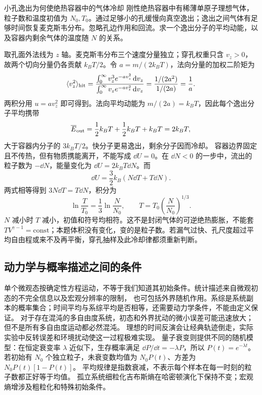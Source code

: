 \Needspace{180pt}
\begin{origexamplebox}{小孔逸出为何使绝热容器中的气体冷却}\label{ch18:ex:teaching-effusion}
刚性绝热容器中有稀薄单原子理想气体，粒子数和温度初值为 $N_0,T_0$。通过足够小的孔缓慢向真空逸出；逸出之间气体有足够时间恢复麦克斯韦分布。忽略孔边作用和回流。求一个逸出分子的平均动能，以及容器内剩余气体的温度随 $N$ 的关系。

\StatQEffusion
\end{origexamplebox}
\Needspace{65pt}
\begin{xesolution}
取孔面外法线为 $z$ 轴。麦克斯韦分布三个速度分量独立；穿孔权重只含 $v_z>0$，故两个切向分量仍各贡献 $k_BT/2$。令 $a=m/(2k_BT)$，法向分量的加权二阶矩为
\[
 \langle v_z^2\rangle_{\rm hit}
 =\frac{\int_0^\infty v_z^3e^{-av_z^2}\mathop{}\!\mathrm d v_z}
        {\int_0^\infty v_ze^{-av_z^2}\mathop{}\!\mathrm d v_z}
 =\frac{1/(2a^2)}{1/(2a)}=\frac1a.
\]
两积分用 $u=av_z^2$ 即可得到。法向平均动能为 $m/(2a)=k_BT$，因此每个逸出分子平均携带
\[
 \overline E_{\rm out}=\frac12k_BT+\frac12k_BT+k_BT=2k_BT,
\]
大于容器内分子的 $3k_BT/2$。快分子更易逸出，剩余分子因而冷却。
容器边界固定且不传热，但有物质携能离开，不能写成 $\dd U=0$。在 $\dd N<0$ 的一步中，流出的粒子数为 $-\dd N$，能量变化为 $\dd U=2k_BT\dd N$。而
\[
 \dd U=\frac32k_B(N\dd T+T\dd N).
\]
两式相等得到 $3N\dd T=T\dd N$，积分为
\[
 \ln\frac{T}{T_0}=\frac13\ln\frac{N}{N_0},\qquad
 T=T_0\left(\frac{N}{N_0}\right)^{1/3}.
\]
$N$ 减小时 $T$ 减小，初值和符号均相符。这不是封闭气体的可逆绝热膨胀，不能套 $TV^{\gamma-1}=\mathrm{const}$；本题体积没有变化，变的是粒子数。若漏气过快、孔尺度超过平均自由程或来不及再平衡，穿孔抽样及此冷却律都须重新判断。

\StatAEffusion
\end{xesolution}

\subsection{动力学与概率描述之间的条件}

单个微观态按确定性方程运动，不等于我们知道其初始条件。统计描述来自微观初态的不完全信息以及宏观分辨率的限制，
也可包括外界随机作用。系综是系统副本的概率集合；时间平均与系综平均是否相等，还需要动力学条件，不能由定义保证。
对于存在混沌的多自由度系统，初态和外界扰动的微小误差可能迅速放大；但不是所有多自由度运动都必然混沌。
理想的时间反演会让经典轨迹倒走，实际实验中反转误差和环境扰动使这一过程极难实现。
量子衰变则提供不同的随机模型：在恒定衰变率 $\lambda$ 近似下，生存概率满足
$\dd P/\dd t=-\lambda P$，所以 $P(t)=e^{-\lambda t}$。
若初始有 $N_0$ 个独立粒子，未衰变数均值为 $N_0P(t)$、方差为 $N_0P(t)[1-P(t)]$。
平均规律是指数衰减，不表示每个样本在每一时刻的粒子数都正好等于均值。
孤立系统细粒化吉布斯熵在哈密顿演化下保持不变；宏观熵增涉及粗粒化和特殊初始条件。

